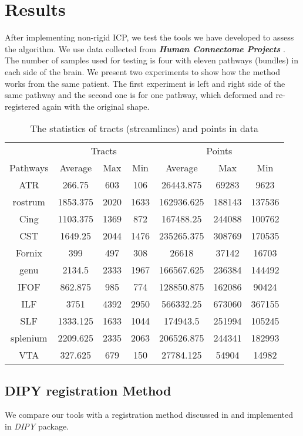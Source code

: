 \documentclass[../structure.tex]{subfiles}
\begin{document}
\chapter{Results}
\hspace{2em}After implementing non-rigid ICP, we test the tools we have developed to assess the algorithm. We use data collected from \textbf{\textit{Human Connectome Projects}} \cite{CCF}. The number of samples used for testing is four with eleven pathways (bundles) in each side of the brain. We present two experiments to show how the method works from the same patient. The first experiment is left and right side of the same pathway and the second one is for one pathway, which deformed and re-registered again with the original shape.

\begin{center}
\begin{table}[h!]
	\begin{tabular}{| c | c  c  c | c  c  c |}
	\toprule
	&\multicolumn{3}{c}{Tracts}&\multicolumn{3}{c}{Points}\\
Pathways&Average&Max&Min&Average&Max&Min\\
\midrule
ATR&266.75&603&106&26443.875&69283&9623\\
rostrum&1853.375&2020&1633&162936.625&188143&137536\\
Cing&1103.375&1369&872&167488.25&244088&100762\\
CST&1649.25&2044&1476&235265.375&308769&170535\\
Fornix&399&497&308&26618&37142&16703\\
genu&2134.5&2333&1967&166567.625&236384&144492\\
IFOF&862.875&985&774&128850.875&162086&90424\\
ILF&3751&4392&2950&566332.25&673060&367155\\
SLF&1333.125&1633&1044&174943.5&251994&105245\\
splenium&2209.625&2335&2063&206526.875&244341&182993\\
VTA&327.625&679&150&27784.125&54904&14982\\
\bottomrule
	\end{tabular}
\caption{The statistics of tracts (streamlines) and points in data}
\label{table:data}
\end{table}
\end{center}

\section{DIPY registration Method}
We compare our tools with a registration method discussed in \cite{Garyfallidis2015} and implemented in \textit{DIPY} package.
\end{document}
